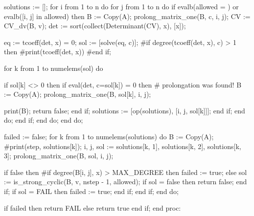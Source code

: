     solutions := [];
    for i from 1 to n do
        for j from 1 to n do
            if evalb(allowed = {}) or evalb([i, j] in allowed) then
                B := Copy(A);
                prolong_matrix_one(B, c, i, j);
                CV := CV_dv(B, v);
                det := sort(collect(Determinant(CV), x), [x]);
                
                eq := tcoeff(det, x) = 0;
                sol := [solve(eq, c)];
                #if degree(tcoeff(det, x), c) > 1 then
                    #print(tcoeff(det, x))
                #end if;
                
                for k from 1 to numelems(sol) do
                
                    if sol[k] <> 0 then
                        if eval(det, c=sol[k]) = 0 then
                            # prolongation was found!
                            B := Copy(A);
                            prolong_matrix_one(B, sol[k], i, j);
                            
                            print(B);
                            return false;
                        end if;
                        solutions := [op(solutions), [i, j, sol[k]]];
                    end if;
                end do;
            end if;
        end do;
    end do;
    
    
    failed := false;
    for k from 1 to numelems(solutions) do
        B := Copy(A);
        #print(step, solutions[k]);
        i, j, sol := solutions[k, 1], solutions[k, 2], solutions[k, 3];
        prolong_matrix_one(B, sol, i, j);
        
        if false then
        #if degree(B[i, j], x) > MAX_DEGREE then
            failed := true;
        else
            sol := is_strong_cyclic(B, v, nstep - 1, allowed);
            if sol = false then
                return false;
            end if;
            if sol = FAIL then
                failed := true;
            end if;
        end if;
    end do;
    
    if failed then
        return FAIL
    else
        return true
    end if;
    end proc:
